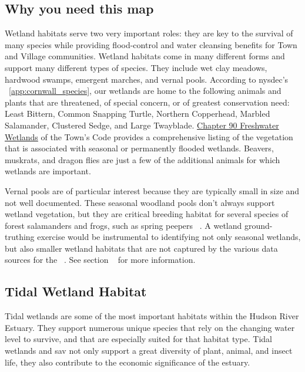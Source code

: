 \subsection*{Why you need this map}
Wetland habitats serve two very important roles: they are key to the survival
of many species while providing flood-control and water cleansing benefits for
Town and Village communities. Wetland habitats come in many different forms and
support many different types of species. They include wet clay meadows,
hardwood swamps, emergent marches, and vernal pools. According to
\gls{nysdec}'s 
~\ref{app:cornwall_species}, our wetlands are home to the following
animals and plants that are threatened, of special concern, or of greatest
conservation need: Least Bittern, Common Snapping Turtle, Northern Copperhead,
Marbled Salamander, Clustered Sedge, and Large Twayblade.
\href{https://ecode360.com/10555547?highlight=wetlands#10555547}{Chapter 90
Freshwater Wetlands} of the Town’s Code provides a comprehensive listing of the
vegetation that is associated with seasonal or permanently flooded wetlands.
Beavers, muskrats, and dragon flies are just a few of the additional animals
for which wetlands are important.
\par
Vernal pools are of particular interest because they are typically small in
size and not well documented. These seasonal woodland pools don't always
support wetland vegetation, but they are critical breeding habitat for several
species of forest salamanders and frogs, such as spring peepers
~\citep{haeckel2014}. A wetland ground-truthing exercise would be instrumental
to identifying not only seasonal wetlands, but also smaller wetland habitats
that are not captured by the various data sources for the 
~. See section ~
for more information.

\label{map:tidalwetlandsandSAV}
\subsection{Tidal Wetland Habitat}\label{subsec:tidalandwetlandhabitat}
Tidal wetlands are some of the most important habitats within the Hudson River
Estuary. They support numerous unique species that rely on the changing water
level to survive, and that are especially suited for that habitat type. Tidal
wetlands and \gls{sav} not only support a great diversity of plant, animal, and
insect life, they also contribute to the economic significance of the estuary.

